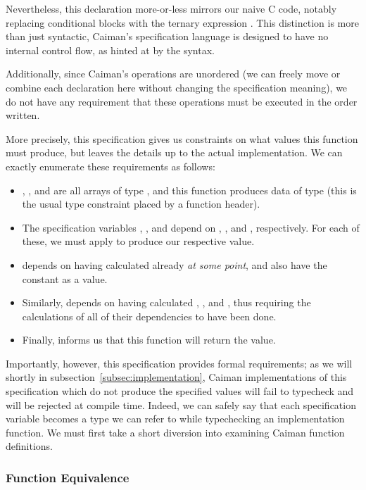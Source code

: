 Nevertheless, this declaration more-or-less mirrors our naive C code, notably replacing conditional  blocks with the ternary expression .  This distinction is more than just syntactic, Caiman's specification language is designed to have no internal control flow, as hinted at by the syntax.

Additionally, since Caiman's operations are unordered (we can freely move or combine each declaration here without changing the specification meaning), we do not have any requirement that these operations must be executed in the order written.

More precisely, this specification gives us constraints on what values this function must produce, but leaves the details up to the actual implementation.  We can exactly enumerate these requirements as follows:
%
\begin{itemize}
\item {}, , and  are all arrays of type , and this function produces data of type  (this is the usual type constraint placed by a function header).
\item The specification variables , , and  depend on , , and , respectively.  For each of these, we must apply  to produce our respective value.
\item {} depends on having calculated  already \textit{at some point}, and also have the constant  as a value.
\item Similarly,  depends on having calculated , , and , thus requiring the calculations of all of their dependencies to have been done.
\item Finally,  informs us that this function will return the  value.
\end{itemize}
%
Importantly, however, this specification provides formal requirements; as we will shortly in subsection~\ref{subsec:implementation}, Caiman implementations of this specification which do not produce the specified values will fail to typecheck and will be rejected at compile time.  Indeed, we can safely say that each specification variable becomes a type we can refer to while typechecking an implementation function.  We must first take a short diversion into examining Caiman function definitions.

\subsubsection{Function Equivalence}

